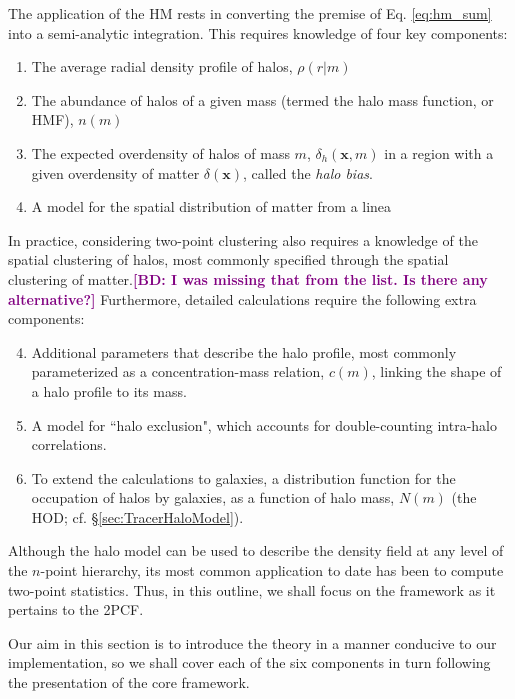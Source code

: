 \documentclass[5p]{elsarticle}
\newcommand{\bd}[1]{\textcolor{purple}{\textbf{[BD: #1]}}}
\begin{document}
The application of the HM rests in converting the premise of Eq. \ref{eq:hm_sum} into a semi-analytic integration. This requires knowledge of four key components:
\begin{enumerate}
    \item The average radial density profile of halos, $\rho(r|m)$
    \item The abundance of halos of a given mass (termed the halo mass function, or HMF), $n(m)$
    \item The expected overdensity of halos of mass $m$, $\delta_h(\mathbf{x},m)$ in a region with a given overdensity of matter $\delta(\mathbf{x})$, called the \textit{halo bias}.
    \item A model for the spatial distribution of matter from a linea 
\end{enumerate}
In practice, considering two-point clustering also requires a knowledge of the spatial clustering of halos, most commonly specified through the spatial clustering of matter.\bd{I was missing that from the list. Is there any alternative?} Furthermore, detailed calculations require the following extra components:
\begin{enumerate}
    \setcounter{enumi}{3}
    \item Additional parameters that describe the halo profile, most
    commonly parameterized as a concentration-mass relation, $c(m)$, linking the shape of a halo profile to its mass.
    \item A model for ``halo exclusion", which accounts for double-counting intra-halo correlations.
    \item To extend the calculations to galaxies, a distribution function for the occupation of halos by galaxies, as a function of halo mass, $N(m)$ (the HOD; cf. \S\ref{sec:TracerHaloModel}). 
\end{enumerate}

Although the halo model can be used to describe the density field at any level of the $n$-point hierarchy, its most common application to date has been to compute two-point statistics. Thus, in this outline, we shall focus on the framework as it pertains to the 2PCF.

Our aim in this section is to introduce the theory in a manner conducive to our implementation, so we shall cover each of the six components in turn following the presentation of the core framework.
\end{document}
